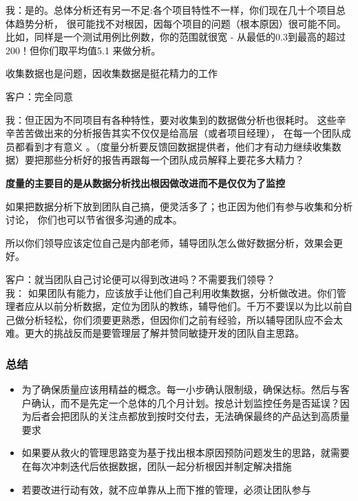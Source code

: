 我：是的。总体分析还有另一不足:各个项目特性不一样，你们现在几十个项目总体趋势分析，
很可能找不对根因，因每个项目的问题（根本原因）很可能不同。
比如，同样是一个测试用例比例数，你的范围就很宽 -
从最低的0.3到最高的超过200！但你们取平均值5.1 来做分析。

收集数据也是问题，因收集数据是挺花精力的工作

客户：完全同意

我：但正因为不同项目有各种特性，要对收集到的数据做分析也很耗时。
这些辛辛苦苦做出来的分析报告其实不仅仅是给高层（或者项目经理），
在每一个团队成员都看到才有意义
。（度量分析要反馈回数据提供者，他们才有动力继续收集数据）要把那些分析好的报告再跟每一个团队成员解释上要花多大精力？

\textbf{度量的主要目的是从数据分析找出根因做改进而不是仅仅为了监控}

如果把数据分析下放到团队自己搞，便灵活多了；也正因为他们有参与收集和分析讨论，
你们也可以节省很多沟通的成本。

所以你们领导应该定位自己是内部老师，辅导团队怎么做好数据分析，效果会更好。

客户：就当团队自己讨论便可以得到改进吗？不需要我们领导？\\
我：
如果团队有能力，应该放手让他们自己利用收集数据，分析做改进。你们管理者应从以前分析数据，定位为团队的教练，辅导他们。千万不要误以为比以前自己做分析轻松，你们须要更熟悉，但因你们之前有经验，所以辅导团队应不会太难。更大的挑战反而是要管理层了解并赞同敏捷开发的团队自主思路。

\hypertarget{ux603bux7ed3}{%
\subsubsection{总结}\label{ux603bux7ed3}}

\begin{itemize}
\tightlist
\item
  为了确保质量应该用精益的概念。每一小步确认限制级，确保达标。然后与客户确认，而不是先定一个总体的几个月计划。按总计划监控任务是否延误？因为后者会把团队的关注点都放到按时交付去，无法确保最终的产品达到高质量要求
\end{itemize}

\begin{itemize}
\tightlist
\item
  如果要从救火的管理思路变为基于找出根本原因预防问题发生的思路，就需要在每次冲刺迭代后依据数据，团队一起分析根因并制定解决措施
\end{itemize}

\begin{itemize}
\tightlist
\item
  若要改进行动有效，就不应单靠从上而下推的管理，必须让团队参与
\end{itemize}

